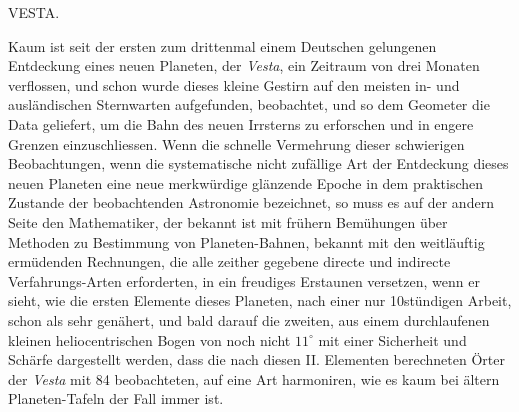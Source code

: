\par{}\bigskip
\hypertarget{native-293-lower}{}
\begin{center}
\large VESTA.
\end{center}

\par\indent Kaum ist seit der ersten zum drittenmal einem Deutschen gelungenen Entdeckung eines neuen Planeten, der \emph{Vesta}, ein Zeitraum von drei Monaten verflossen, und schon wurde dieses kleine Gestirn auf den meisten in- und ausländischen Sternwarten aufgefunden, beobachtet, und so dem Geometer die Data geliefert, um die Bahn des neuen Irrsterns zu erforschen und in engere Grenzen einzuschliessen. Wenn die schnelle Vermehrung dieser schwierigen Beobachtungen, wenn die systematische nicht zufällige Art der Entdeckung dieses neuen Planeten eine neue merkwürdige glänzende Epoche in dem praktischen Zustande der beobachtenden Astronomie bezeichnet, so muss es auf der andern Seite den Mathematiker, der bekannt ist mit frühern Bemühungen über Methoden zu Bestimmung von Planeten-Bahnen, bekannt mit den weitläuftig ermüdenden Rechnungen, die alle zeither gegebene directe und indirecte Verfahrungs-Arten erforderten, in ein freudiges Erstaunen versetzen, wenn er sieht, wie die ersten Elemente dieses Planeten, nach einer nur 10stündigen Arbeit, schon als sehr genähert, und bald darauf die zweiten, aus einem durchlaufenen kleinen heliocentrischen Bogen von noch nicht $11^\circ$ mit einer Sicherheit und Schärfe dargestellt werden, dass die nach diesen II. Elementen berechneten Örter der \emph{Vesta} mit 84 beobachteten, auf eine Art harmoniren, wie es kaum bei ältern Planeten-Tafeln der Fall immer ist.

